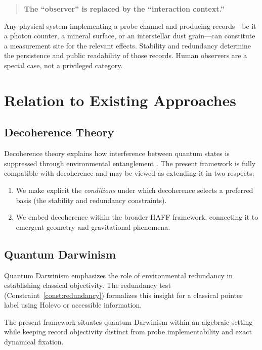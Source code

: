 \documentclass[12pt,a4paper]{article}
\begin{document}
\begin{quote}
\textbf{The ``observer'' is replaced by the ``interaction context.''}
\end{quote}

Any physical system implementing a probe channel and producing records---be it a photon counter, a mineral surface, or an interstellar dust grain---can constitute a measurement site for the relevant effects. Stability and redundancy determine the persistence and public readability of those records. Human observers are a special case, not a privileged category.

\section{Relation to Existing Approaches}
\label{sec:relations}

\subsection{Decoherence Theory}

Decoherence theory explains how interference between quantum states is suppressed through environmental entanglement \cite{Zurek2003}. The present framework is fully compatible with decoherence and may be viewed as extending it in two respects:

\begin{enumerate}
    \item We make explicit the \emph{conditions} under which decoherence selects a preferred basis (the stability and redundancy constraints).
    \item We embed decoherence within the broader HAFF framework, connecting it to emergent geometry and gravitational phenomena.
\end{enumerate}

\subsection{Quantum Darwinism}

Quantum Darwinism \cite{Zurek2009} emphasizes the role of environmental redundancy in establishing classical objectivity. The redundancy test (Constraint~\ref{const:redundancy}) formalizes this insight for a classical pointer label using Holevo or accessible information.

The present framework situates quantum Darwinism within an algebraic setting while keeping record objectivity distinct from probe implementability and exact dynamical fixation.
\end{document}
